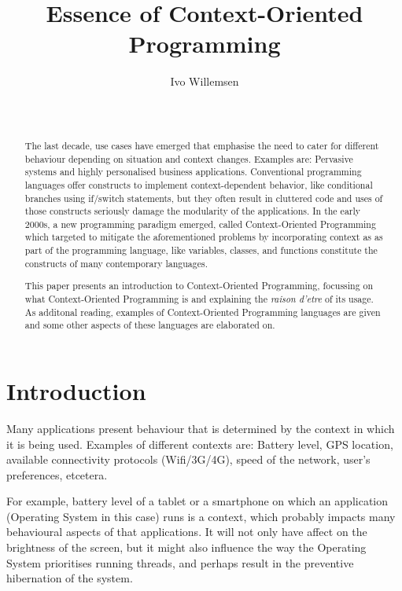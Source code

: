 \documentclass{acm_proc_article-sp}
\begin{document}
\title{Essence of Context-Oriented Programming}

\author{
\alignauthor
Ivo Willemsen\\
       \\
       \\
}

\maketitle
\begin{abstract}
The last decade, use cases have emerged that emphasise the need to cater for different behaviour depending on situation and context changes. Examples are: Pervasive systems \cite{pervasivecomputing} and highly personalised business applications. Conventional programming languages offer constructs to implement context-dependent behavior, like  conditional branches using if/switch statements, but they often result in cluttered code and uses of those 
constructs seriously damage the modularity of the applications. In the early 2000s, a new programming paradigm emerged, called Context-Oriented Programming which targeted to mitigate the aforementioned problems by incorporating context as as part of the programming language, like variables, classes, and functions constitute the constructs 
of many contemporary languages.

This paper presents an introduction to Context-Oriented Programming, focussing on what Context-Oriented Programming is and explaining the \textit{raison d'etre} of its usage. As additonal reading, examples of Context-Oriented Programming languages are given and some other aspects of these languages are elaborated on.  
\end{abstract}


\section{Introduction} \label{introduction}
Many applications present behaviour that is determined by the context in which it is being used. Examples of different contexts are: Battery level, GPS location, available connectivity protocols (Wifi/3G/4G), speed of the network, user's preferences, etcetera.

For example, battery level of a tablet or a smartphone on which an application (Operating System in this case) runs is a context, which probably impacts many behavioural aspects of that applications. It will not only have affect on the brightness of the screen, but it might also influence the way the Operating System prioritises running threads, and perhaps result in the preventive hibernation of the system.
\end{document}
